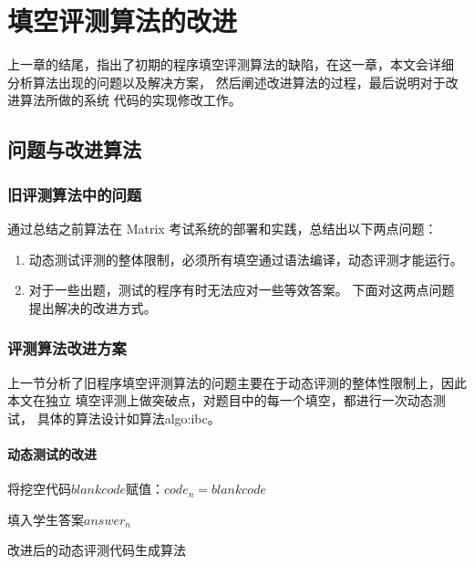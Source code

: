 \chapter{填空评测算法的改进}
\label{cha:aglorithm_improvement}

上一章的结尾，指出了初期的程序填空评测算法的缺陷，在这一章，本文会详细
分析算法出现的问题以及解决方案，
然后阐述改进算法的过程，最后说明对于改进算法所做的系统
代码的实现修改工作。

\section{问题与改进算法}
\subsection{旧评测算法中的问题}
通过总结之前算法在 Matrix 考试系统的部署和实践，总结出以下两点问题：
\begin{enumerate}
  \item 动态测试评测的整体限制，必须所有填空通过语法编译，动态评测才能运行。
  \item 对于一些出题，测试的程序有时无法应对一些等效答案。
下面对这两点问题提出解决的改进方式。
\end{enumerate}

\subsection{评测算法改进方案}

上一节分析了旧程序填空评测算法的问题主要在于动态评测的整体性限制上，因此本文在独立
填空评测上做突破点，对题目中的每一个填空，都进行一次动态测试，
具体的算法设计如算法{algo:ibc}。

\subsubsection{动态测试的改进}

\begin{algorithm}[h]
将挖空代码$blankcode$赋值：$code_n = blankcode$

 {
   {
    填入学生答案$answer_n$
  } 
}
\caption{改进后的动态评测代码生成算法}
\label{algo:ibc}
\end{algorithm}


